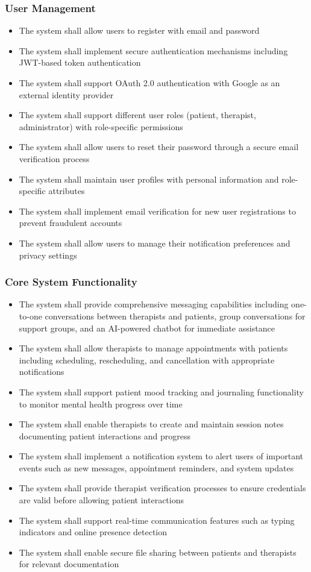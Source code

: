 \subsubsection{User Management}
\begin{itemize}
    \item The system shall allow users to register with email and password
    \item The system shall implement secure authentication mechanisms including JWT-based token authentication
    \item The system shall support OAuth 2.0 authentication with Google as an external identity provider
    \item The system shall support different user roles (patient, therapist, administrator) with role-specific permissions
    \item The system shall allow users to reset their password through a secure email verification process
    \item The system shall maintain user profiles with personal information and role-specific attributes
    \item The system shall implement email verification for new user registrations to prevent fraudulent accounts
    \item The system shall allow users to manage their notification preferences and privacy settings
\end{itemize}

\subsubsection{Core System Functionality}
\begin{itemize}
    \item The system shall provide comprehensive messaging capabilities including one-to-one conversations between therapists and patients, group conversations for support groups, and an AI-powered chatbot for immediate assistance
    \item The system shall allow therapists to manage appointments with patients including scheduling, rescheduling, and cancellation with appropriate notifications
    \item The system shall support patient mood tracking and journaling functionality to monitor mental health progress over time
    \item The system shall enable therapists to create and maintain session notes documenting patient interactions and progress
    \item The system shall implement a notification system to alert users of important events such as new messages, appointment reminders, and system updates
    \item The system shall provide therapist verification processes to ensure credentials are valid before allowing patient interactions
    \item The system shall support real-time communication features such as typing indicators and online presence detection
    \item The system shall enable secure file sharing between patients and therapists for relevant documentation
\end{itemize}

